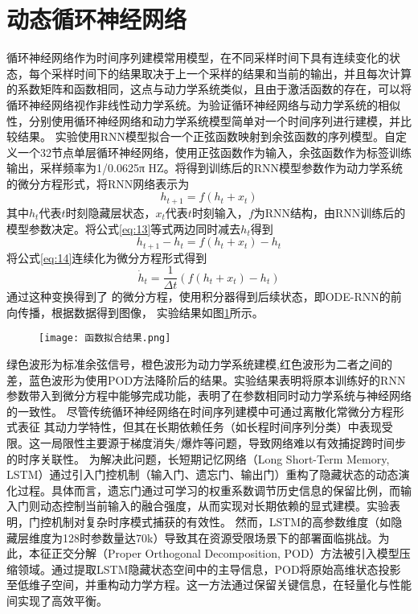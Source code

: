 \section{动态循环神经网络}
循环神经网络作为时间序列建模常用模型，在不同采样时间下具有连续变化的状态，每个采样时间下的结果取决于上一个采样的结果和当前的输出，并且每次计算的系数矩阵和函数相同，这点与动力学系统类似，且由于激活函数的存在，可以将循环神经网络视作非线性动力学系统。为验证循环神经网络与动力学系统的相似性，分别使用循环神经网络和动力学系统模型简单对一个时间序列进行建模，并比较结果。
实验使用RNN模型拟合一个正弦函数映射到余弦函数的序列模型。自定义一个32节点单层循环神经网络，使用正弦函数作为输入，余弦函数作为标签训练输出，采样频率为1/0.0625π HZ。将得到训练后的RNN模型参数作为动力学系统的微分方程形式，将RNN网络表示为
\begin{equation}
\label{eq:13}
{h_{t + 1}} = f({h_t} + {x_t})
\end{equation}
其中$h_t$代表$t$时刻隐藏层状态，$x_t$代表$t$时刻输入，$f$为RNN结构，由RNN训练后的模型参数决定。将公式\ref{eq:13}等式两边同时减去$h_t$得到
\begin{equation}
\label{eq:14}
{h_{t + 1}} - {h_t} = f({h_t} + {x_t}) - {h_t}
\end{equation}
将公式\ref{eq:14}连续化为微分方程形式得到
\begin{equation}
\label{eq:15}
  {\dot h_t} = \frac{1}{{\Delta t}}(f({h_t} + {x_t}) - {h_t})
\end{equation}
通过这种变换得到了 的微分方程，使用积分器得到后续状态，即ODE-RNN的前向传播，根据数据得到图像， 实验结果如图\ref{fig:函数拟合结果}所示。
\begin{figure}[!htbp]
  \centering
  \texttt{[image: 函数拟合结果.png]}
  \label{fig:函数拟合结果}
\end{figure}
绿色波形为标准余弦信号，橙色波形为动力学系统建模,红色波形为二者之间的差，蓝色波形为使用POD方法降阶后的结果。实验结果表明将原本训练好的RNN参数带入到微分方程中能够完成功能，表明了在参数相同时动力学系统与神经网络的一致性。
尽管传统循环神经网络在时间序列建模中可通过离散化常微分方程形式表征
其动力学特性，但其在长期依赖任务（如长程时间序列分类）中表现受限。这一局限性主要源于梯度消失/爆炸等问题，导致网络难以有效捕捉跨时间步的时序关联性。
为解决此问题，长短期记忆网络（Long Short-Term Memory, LSTM）\cite{hochreiter1997long}通过引入门控机制（输入门、遗忘门、输出门）重构了隐藏状态的动态演化过程。具体而言，遗忘门通过可学习的权重系数调节历史信息的保留比例，而输入门则动态控制当前输入的融合强度，从而实现对长期依赖的显式建模。实验表明，门控机制对复杂时序模式捕获的有效性。
然而，LSTM的高参数维度（如隐藏层维度为128时参数量达70k）导致其在资源受限场景下的部署面临挑战。为此，本征正交分解（Proper Orthogonal Decomposition, POD）方法被引入模型压缩领域。通过提取LSTM隐藏状态空间中的主导信息，POD将原始高维状态投影至低维子空间，并重构动力学方程。这一方法通过保留关键信息，在轻量化与性能间实现了高效平衡。


